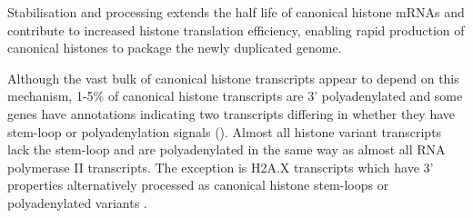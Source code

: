   Stabilisation and processing extends the half life of canonical histone mRNAs
  and contribute to increased histone translation efficiency,
  enabling rapid production of canonical histones to package the newly duplicated genome.

  Although the vast bulk of canonical histone transcripts appear to depend on this mechanism,
  1-5\% of canonical histone transcripts are 3' polyadenylated \citep{YangGenomeBiol2011}
  and some genes have annotations indicating two transcripts
  differing in whether they have stem-loop or polyadenylation signals ().
  Almost all histone variant transcripts lack the stem-loop and are polyadenylated
  in the same way as almost all RNA polymerase II transcripts.
  The exception is H2A.X transcripts which have 3' properties alternatively
  processed as canonical histone stem-loops
  or polyadenylated variants \citep{HTwoAX-transcripts,our-H2AX-review}.
